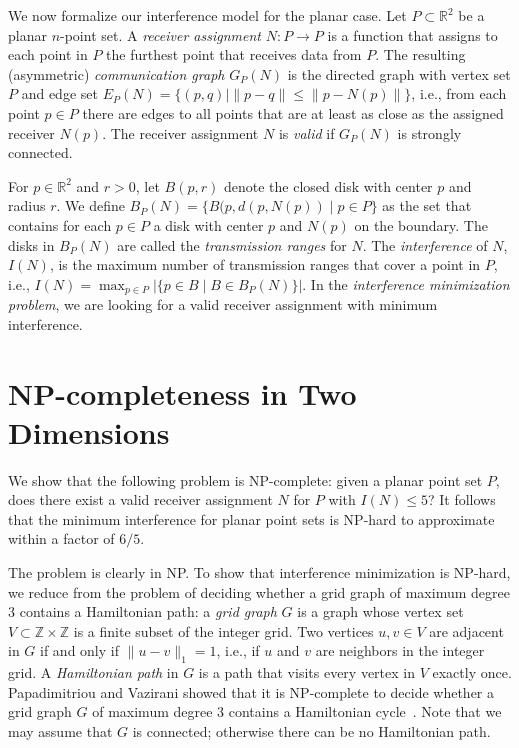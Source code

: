 \documentclass[envcountsect,envcountsame,runningheads,a4paper]{llncs}
\def\Z{{\mathbb Z}}
\newcommand\R{{\mathbb R}}
\begin{document}
We now formalize our interference model for the
planar case.
Let $P \subset \R^2$ be a planar $n$-point set.
A \emph{receiver assignment} $N : P \rightarrow P$
is a function that assigns to each point in $P$ the furthest
point that receives data from $P$.
The resulting (asymmetric) \emph{communication graph}
$G_P(N)$ is the directed graph
with vertex set $P$ and edge set
$E_P(N) = \{(p, q) \mid \|p - q\| \leq  \|p - N(p)\|\}$,
i.e., from each point $p \in P$ there are edges
to all points that are at least as close as the
assigned receiver $N(p)$.
The receiver assignment $N$ is \emph{valid}
if $G_P(N)$ is strongly connected.

For $p \in \R^2$ and $r > 0$, let $B(p, r)$ denote
the closed disk with center $p$ and radius $r$.
We define $B_P(N) = \{B(p, d(p, N(p)) \mid p \in P \}$ as the
set that contains for each $p \in P$
a disk with center $p$ and $N(p)$ on the boundary.
The disks in $B_P(N)$ are called the \emph{transmission
ranges} for $N$.
The \emph{interference}
of $N$, $I(N)$, is the maximum number of transmission ranges
that cover a point in $P$, i.e.,
$I(N) = \max_{p \in P} |\{ p \in B \mid B \in B_P(N) \}|$.
In the \emph{interference minimization problem}, we are looking for
a valid receiver assignment with minimum interference.

\section{NP-completeness in Two Dimensions}

We show that the following problem is
NP-complete: given a planar point set
$P$, does there exist a valid receiver assignment
$N$ for $P$ with $I(N) \leq 5$?
It follows that the minimum interference for
planar point sets is
NP-hard to approximate within a
factor of $6/5$.

The problem is clearly in NP.
To show that interference minimization is NP-hard,
we reduce from the problem of deciding
whether a grid graph of maximum degree $3$ contains
a Hamiltonian path:
a \emph{grid graph} $G$ is a graph whose vertex
set $V \subset \Z \times \Z$ is a finite
subset of the integer grid.
Two vertices $u, v \in V$ are adjacent in $G$
if and only if $\|u-v\|_1=1$, i.e., if $u$ and $v$
are neighbors in the integer grid.
A \emph{Hamiltonian path} in $G$ is a path
that visits every vertex in $V$ exactly once.
Papadimitriou and Vazirani showed that
it is NP-complete to decide whether a grid graph $G$
of maximum degree $3$ contains a Hamiltonian
cycle~\cite{PapadimitriouVa84}.
Note that we may assume that $G$
is connected;
otherwise there can be no Hamiltonian path.
\end{document}
